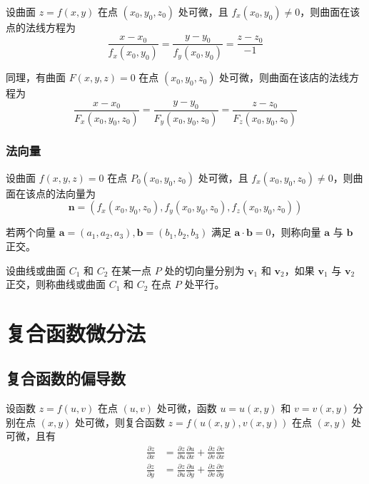 \begin{definition}
    设曲面 $z=f(x,y)$ 在点 $(x_0,y_0,z_0)$ 处可微，且 $f_x(x_0,y_0)\neq 0$，则曲面在该点的法线方程为
    \[
        \frac{x-x_0}{f_x(x_0,y_0)}=\frac{y-y_0}{f_y(x_0,y_0)}=\frac{z-z_0}{-1}
    \]
\end{definition}

同理，有曲面 $F(x,y,z)=0$ 在点 $(x_0,y_0,z_0)$ 处可微，则曲面在该店的法线方程为
\[
    \frac{x-x_0}{F_x(x_0,y_0,z_0)}=\frac{y-y_0}{F_y(x_0,y_0,z_0)}=\frac{z-z_0}{F_z(x_0,y_0,z_0)}
\]

\subsubsection{法向量}

设曲面 $f(x,y,z)=0$ 在点 $P_0(x_0,y_0,z_0)$ 处可微，且 $f_x(x_0,y_0,z_0)\neq 0$，则曲面在该点的法向量为
\[
    \bm{n}=(f_x(x_0,y_0,z_0),f_y(x_0,y_0,z_0),f_z(x_0,y_0,z_0))
\]

\begin{definition}[正交]
    若两个向量 $\bm{a}=(a_1,a_2,a_3),\bm{b}=(b_1,b_2,b_3)$ 满足 $\bm{a}\cdot\bm{b}=0$，则称向量 $\bm{a}$ 与 $\bm{b}$ 正交。
\end{definition}

\begin{definition}[平行]
    设曲线或曲面 $C_1$ 和 $C_2$ 在某一点 $P$ 处的切向量分别为 $\bm{v}_1$ 和 $\bm{v}_2$，如果 $\bm{v}_1$ 与 $\bm{v}_2$ 正交，则称曲线或曲面 $C_1$ 和 $C_2$ 在点 $P$ 处平行。
\end{definition}


\section{复合函数微分法}

\subsection{复合函数的偏导数}

\begin{theorem}
    设函数 $z=f(u,v)$ 在点 $(u,v)$ 处可微，函数 $u=u(x,y)$ 和 $v=v(x,y)$ 分别在点 $(x,y)$ 处可微，则复合函数 $z=f(u(x,y),v(x,y))$ 在点 $(x,y)$ 处可微，且有
    \[
        \begin{aligned}
            \frac{\partial z}{\partial x} & =\frac{\partial z}{\partial u}\frac{\partial u}{\partial x}+\frac{\partial z}{\partial v}\frac{\partial v}{\partial x} \\
            \frac{\partial z}{\partial y} & =\frac{\partial z}{\partial u}\frac{\partial u}{\partial y}+\frac{\partial z}{\partial v}\frac{\partial v}{\partial y}
        \end{aligned}
    \]
\end{theorem}

